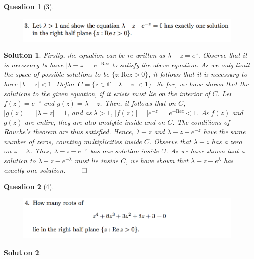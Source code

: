 \documentclass{article} %
\theoremstyle{quest}
\newtheorem*{question}{Question}
\newtheorem*{solution}{Solution}
\begin{document}
\begin{question}[3]
\hfill
\begin{figure}[h!]
\centering
\includegraphics[width=1\textwidth]{cv-9-3}
\end{figure}
\end{question}
\begin{solution}
Firstly, the equation can be re-written as $\lambda - z = e^{z}$.
Observe that it is necessary to have
$| \lambda - z | = e^{-\text{Re} z}$ to satisfy the above equation.
As we only limit the space of possible solutions to be $\{ z : \text{Re} z 
> 0\}$, it follows that it is necessary to have $|\lambda - z | < 1$.
Define $C = \{ z \in \mathbb{C} \> | \> | \lambda - z| < 1 \}$. So far,
we have shown that the solutions to the given equation, if it exists
must lie on the interior of $C$. 
Let $f(z) = e^{-z}$
and $g(z) = \lambda - z $. Then, it follows that on $C$, $|g(z)| = |\lambda
-z | = 1$, and as $\lambda > 1$, $|f(z)| = |e^{-z}| = e^{-\text{Re}z} < 1$. 
As $f(z)$ and $g(z)$ are entire, they are also analytic inside
and on $C$. The conditions of Rouche's theorem are thus satisfied. Hence,
$\lambda - z$ and $\lambda - z - e^{-z}$ have the same number of zeros, 
counting multiplicities inside $C$. Observe that $\lambda - z$ has a 
zero on $z = \lambda$. Thus, $\lambda -z -e^{-z}$ has one solution
inside $C$. As we have shown that a solution to $\lambda -z -e^{-\lambda}$
must lie inside $C$, we have shown that $\lambda -z -e^{\lambda}$ has
exactly one solution. \hfill $\qed$

\end{solution}

\bigskip

\begin{question}[4]
\hfill
\begin{figure}[h!]
\centering
\includegraphics[width=1\textwidth]{cv-9-4}
\end{figure}
\end{question}
\begin{solution}
\end{solution}
\end{document}

